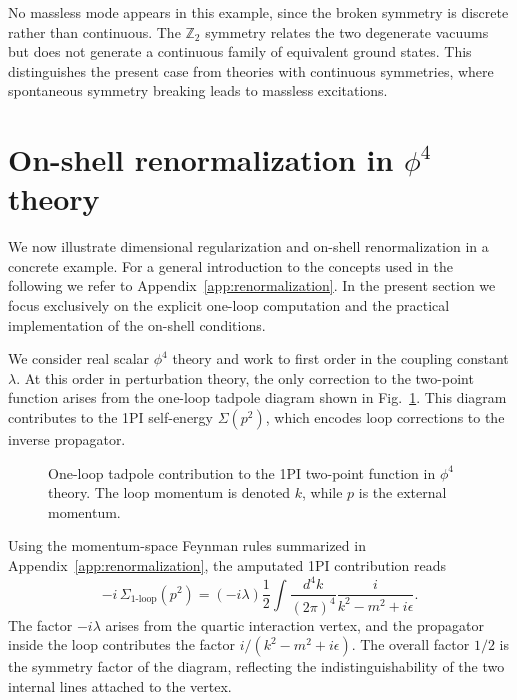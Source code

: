No massless mode appears in this example, since the broken symmetry is discrete
rather than continuous. The $\mathbb{Z}_2$ symmetry relates the two degenerate
vacuums but does not generate a continuous family of equivalent ground states.
This distinguishes the present case from theories with continuous symmetries,
where spontaneous symmetry breaking leads to massless excitations.

\section{On-shell renormalization in \texorpdfstring{$\phi^4$}{phi4} theory}
\label{sec:phi4_onshell_example}

We now illustrate dimensional regularization and on-shell
renormalization in a concrete example.
For a general introduction to the concepts used in the following
we refer to Appendix~\ref{app:renormalization}.
In the present section we focus exclusively on the explicit
one-loop computation and the practical implementation of the
on-shell conditions.

We consider real scalar $\phi^4$ theory and work to first order in the
coupling constant $\lambda$.
At this order in perturbation theory, the only correction to the
two-point function arises from the one-loop tadpole diagram shown in
Fig.~\ref{fig:tadpole}.
This diagram contributes to the 1PI
self-energy $\Sigma(p^2)$, which encodes loop corrections to the
inverse propagator.

\begin{figure}[htbp]
\centering
{}
\caption{One-loop tadpole contribution to the 1PI two-point function
in $\phi^4$ theory. The loop momentum is denoted $k$, while $p$
is the external momentum.}
\label{fig:tadpole}
\end{figure}

Using the momentum-space Feynman rules summarized in
Appendix~\ref{app:renormalization}, the amputated 1PI contribution reads
\begin{equation}
-i\,\Sigma_{\text{1-loop}}(p^2)
=
\left(-i\lambda\right)\frac{1}{2}
\int\!\frac{d^4k}{(2\pi)^4}
\frac{i}{k^2 - m^2 + i\epsilon}.
\label{eq:tadpole_selfenergy_start}
\end{equation}
The factor $-i\lambda$ arises from the quartic interaction vertex,
and the propagator inside the loop contributes the factor
$i/(k^2-m^2+i\epsilon)$.
The overall factor $1/2$ is the symmetry factor of the diagram,
reflecting the indistinguishability of the two internal lines attached
to the vertex.

